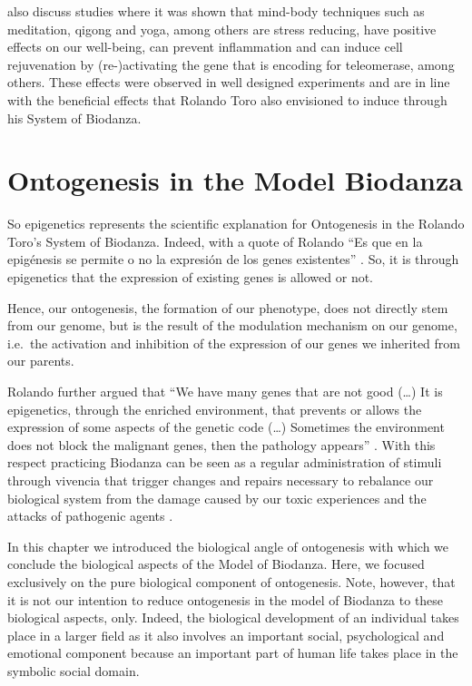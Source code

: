 \documentclass[
  11pt,
]{book}
\begin{document}
\citet{BlackburnEpel2017} also discuss studies where it was shown that mind-body techniques such as meditation, qigong and yoga, among others are stress reducing, have positive effects on our well-being, can prevent inflammation and can induce cell rejuvenation by (re-)activating the gene that is encoding for teleomerase, among others. These effects were observed in well designed experiments and are in line with the beneficial effects that Rolando Toro also envisioned to induce through his System of Biodanza.

\hypertarget{ontogenesis-in-the-model-biodanza}{%
\section{Ontogenesis in the Model Biodanza}\label{ontogenesis-in-the-model-biodanza}}

So epigenetics represents the scientific explanation for Ontogenesis in the Rolando Toro's System of Biodanza. Indeed, with a quote of Rolando ``Es que en la epigénesis
se permite o no la expresión de los genes existentes'' \citep{Montanari2023}. So, it is through epigenetics that the expression of existing genes is allowed or not.

Hence, our ontogenesis, the formation of our phenotype, does not directly stem from our genome, but is the result of the modulation mechanism on our genome, i.e.~the activation and inhibition of the expression of our genes we inherited from our parents.

Rolando further argued that ``We have many genes that are not good (\ldots) It is epigenetics, through the enriched environment, that prevents or allows the expression of some aspects of the genetic code (\ldots) Sometimes the environment does not block the malignant genes, then the pathology appears'' \citep{Montanari2023}. With this respect practicing Biodanza can be seen as a regular administration of stimuli through vivencia that trigger changes and repairs necessary to rebalance our biological system from the damage caused by our toxic experiences and the attacks of pathogenic agents \citep{Montanari2023}.

In this chapter we introduced the biological angle of ontogenesis with which we conclude the biological aspects of the Model of Biodanza. Here, we focused exclusively on the pure biological component of ontogenesis. Note, however, that it is not our intention to reduce ontogenesis in the model of Biodanza to these biological aspects, only. Indeed, the biological development of an individual takes place in a larger field as it also involves an important social, psychological and emotional component because an important part of human life takes place in the symbolic social domain.
\end{document}

